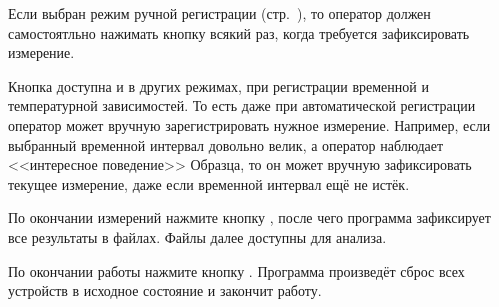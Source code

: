 \documentclass[12pt, a4paper, twocolumn]{report}
\begin{document}
Если выбран режим ручной регистрации (стр.~\pageref{sec_reg_type_manual}), то оператор должен самостоятльно нажимать кнопку  всякий раз, когда требуется зафиксировать измерение.

Кнопка  доступна и в других режимах, при регистрации временной и температурной зависимостей. То есть даже при автоматической регистрации оператор может вручную зарегистрировать нужное измерение. Например, если выбранный временной интервал довольно велик, а оператор наблюдает <<интересное поведение>> Образца, то он может вручную зафиксировать текущее измерение, даже если временной интервал ещё не истёк.

По окончании измерений нажмите кнопку , после чего программа зафиксирует все результаты в файлах. Файлы далее доступны для анализа.

По окончании работы нажмите кнопку . Программа произведёт сброс всех устройств в исходное состояние и закончит работу.
\end{document}

